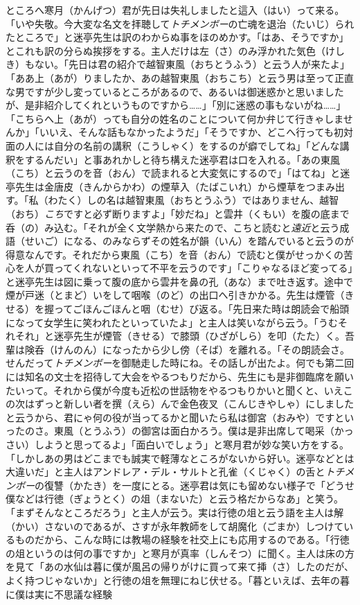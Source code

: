 \documentclass{book}
\begin{document}
ところへ寒月（かんげつ）君が先日は失礼しましたと這入（はい）って来る。「いや失敬。今大変な名文を拝聴して\emph{トチメンボー}の亡魂を退治（たいじ）られたところで」と迷亭先生は訳のわからぬ事をほのめかす。「はあ、そうですか」とこれも訳の分らぬ挨拶をする。主人だけは左（さ）のみ浮かれた気色（けしき）もない。「先日は君の紹介で越智東風（おちとうふう）と云う人が来たよ」「ああ上（あが）りましたか、あの越智東風（おちこち）と云う男は至って正直な男ですが少し変っているところがあるので、あるいは御迷惑かと思いましたが、是非紹介してくれというものですから\ldots{}\ldots{}」「別に迷惑の事もないがね\ldots{}\ldots{}」「こちらへ上（あが）っても自分の姓名のことについて何か弁じて行きゃしませんか」「いいえ、そんな話もなかったようだ」「そうですか、どこへ行っても初対面の人には自分の名前の講釈（こうしゃく）をするのが癖でしてね」「どんな講釈をするんだい」と事あれかしと待ち構えた迷亭君は口を入れる。「あの東風（こち）と云うのを音（おん）で読まれると大変気にするので」「はてね」と迷亭先生は金唐皮（きんからかわ）の煙草入（たばこいれ）から煙草をつまみ出す。「私（わたく）しの名は越智東風（おちとうふう）ではありません、越智（おち）\emph{こち}ですと必ず断りますよ」「妙だね」と雲井（くもい）を腹の底まで呑（の）み込む。「それが全く文学熱から来たので、こちと読むと\emph{遠近}と云う成語（せいご）になる、のみならずその姓名が韻（いん）を踏んでいると云うのが得意なんです。それだから東風（こち）を音（おん）で読むと僕がせっかくの苦心を人が買ってくれないといって不平を云うのです」「こりゃなるほど変ってる」と迷亭先生は図に乗って腹の底から雲井を鼻の孔（あな）まで吐き返す。途中で煙が戸迷（とまど）いをして咽喉（のど）の出口へ引きかかる。先生は煙管（きせる）を握ってごほんごほんと咽（むせ）び返る。「先日来た時は朗読会で船頭になって女学生に笑われたといっていたよ」と主人は笑いながら云う。「うむそれそれ」と迷亭先生が煙管（きせる）で膝頭（ひざがしら）を叩（たた）く。吾輩は険呑（けんのん）になったから少し傍（そば）を離れる。「その朗読会さ。せんだって\emph{トチメンボー}を御馳走した時にね。その話しが出たよ。何でも第二回には知名の文士を招待して大会をやるつもりだから、先生にも是非御臨席を願いたいって。それから僕が今度も近松の世話物をやるつもりかいと聞くと、いえこの次はずっと新しい者を撰（えら）んで金色夜叉（こんじきやしゃ）にしましたと云うから、君にゃ何の役が当ってるかと聞いたら私は御宮（おみや）ですといったのさ。東風（とうふう）の御宮は面白かろう。僕は是非出席して喝采（かっさい）しようと思ってるよ」「面白いでしょう」と寒月君が妙な笑い方をする。「しかしあの男はどこまでも誠実で軽薄なところがないから好い。迷亭などとは大違いだ」と主人はアンドレア・デル・サルトと孔雀（くじゃく）の舌と\emph{トチメンボー}の復讐（かたき）を一度にとる。迷亭君は気にも留めない様子で「どうせ僕などは行徳（ぎょうとく）の俎（まないた）と云う格だからなあ」と笑う。「まずそんなところだろう」と主人が云う。実は行徳の俎と云う語を主人は解（かい）さないのであるが、さすが永年教師をして胡魔化（ごまか）しつけているものだから、こんな時には教場の経験を社交上にも応用するのである。「行徳の俎というのは何の事ですか」と寒月が真率（しんそつ）に聞く。主人は床の方を見て「あの水仙は暮に僕が風呂の帰りがけに買って来て挿（さ）したのだが、よく持つじゃないか」と行徳の俎を無理にねじ伏せる。「暮といえば、去年の暮に僕は実に不思議な経験
\end{document}
